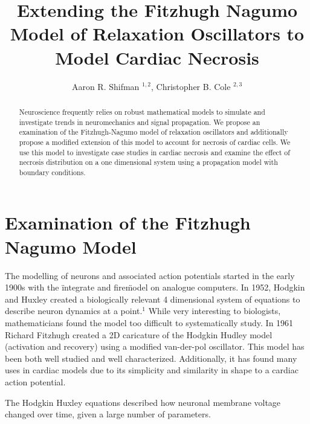 \documentclass[11pt]{article}
\begin{document}
\title{Extending the Fitzhugh Nagumo Model of Relaxation Oscillators to Model Cardiac Necrosis}
\author{Aaron R. Shifman $^{1,2}$, Christopher B. Cole $^{2,3}$}
\maketitle
\tableofcontents

\begin{abstract}

Neuroscience frequently relies on robust mathematical models to simulate and investigate trends in neuromechanics and signal propagation. We propose an examination of the Fitzhugh-Nagumo model of relaxation oscillators and additionally propose a modified extension of this model to account for necrosis of cardiac cells. We use this model to investigate case studies in cardiac necrosis and examine the effect of necrosis distribution on a one dimensional system using a propagation model with boundary conditions. 
\end{abstract}

\section{Examination of the Fitzhugh Nagumo Model}

The modelling of neurons and associated action potentials started in the early 1900s with the \"integrate and fire\" model on analogue computers. In 1952, Hodgkin and Huxley created a biologically relevant 4 dimensional system of equations to describe neuron dynamics at a point.$^1$ While very interesting to biologists, mathematicians found the model too difficult to systematically study. In 1961 Richard Fitzhugh created a 2D caricature of the Hodgkin Hudley model (activation and recovery) using a modified van-der-pol oscillator. This model has been both well studied and well characterized. Additionally, it has found many uses in cardiac models due to its simplicity and similarity in shape to a cardiac action potential. 

The Hodgkin Huxley equations described how neuronal membrane voltage changed over time, given a large number of parameters. 
\end{document}
